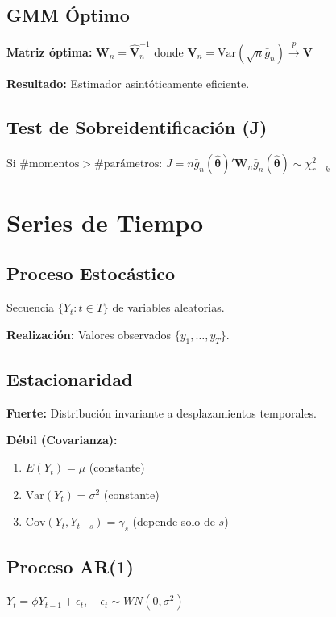 \documentclass[9pt, spanish, twoside]{article}
\newcommand{\critical}[1]{\textcolor{CriticalRed}{\textbf{#1}}}
\newcommand{\eqbox}[1]{\colorbox{TitaniumGray}{$\displaystyle #1$}}
\begin{document}
\begin{multicols*}{3}
\subsection{GMM Óptimo}
\critical{Matriz óptima:} $\mathbf{W}_n = \hat{\mathbf{V}}_n^{-1}$ donde
$\mathbf{V}_n = \text{Var}(\sqrt{n}\bar{g}_n) \xrightarrow{p} \mathbf{V}$

\textbf{Resultado:} Estimador asintóticamente eficiente.

\subsection{Test de Sobreidentificación (J)}
Si $\#\text{momentos} > \#\text{parámetros}$:
$J = n\bar{g}_n(\hat{\boldsymbol{\theta}})'\mathbf{W}_n\bar{g}_n(\hat{\boldsymbol{\theta}}) \sim \chi^2_{r-k}$



\section{Series de Tiempo}
\subsection{Proceso Estocástico}
Secuencia $\{Y_t: t \in T\}$ de variables aleatorias.

\textbf{Realización:} Valores observados $\{y_1, \ldots, y_T\}$.

\subsection{Estacionaridad}
\textbf{Fuerte:} Distribución invariante a desplazamientos temporales.

\textbf{Débil (Covarianza):}
\begin{enumerate}[leftmargin=8pt, noitemsep, topsep=2pt]
    \item $E(Y_t) = \mu$ (constante)
    \item $\text{Var}(Y_t) = \sigma^2$ (constante)
    \item $\text{Cov}(Y_t, Y_{t-s}) = \gamma_s$ (depende solo de $s$)
\end{enumerate}

\subsection{Proceso AR(1)}
\eqbox{Y_t = \phi Y_{t-1} + \epsilon_t, \quad \epsilon_t \sim WN(0, \sigma^2)}


\end{multicols*}
\end{document}
